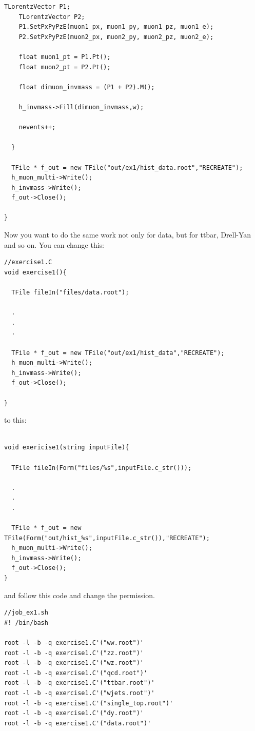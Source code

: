\documentclass[11pt]{article}
\begin{document}
\begin{lstlisting}[emph={if,while,continue,new},emphstyle=\color{nut}]
    TLorentzVector P1;
    TLorentzVector P2;
    P1.SetPxPyPzE(muon1_px, muon1_py, muon1_pz, muon1_e);
    P2.SetPxPyPzE(muon2_px, muon2_py, muon2_pz, muon2_e);

    float muon1_pt = P1.Pt();
    float muon2_pt = P2.Pt();

    float dimuon_invmass = (P1 + P2).M();

    h_invmass->Fill(dimuon_invmass,w);

    nevents++;

  }

  TFile * f_out = new TFile("out/ex1/hist_data.root","RECREATE");
  h_muon_multi->Write();
  h_invmass->Write();
  f_out->Close();

}

\end{lstlisting}
Now you want to do the same work not only for data, but for ttbar, Drell-Yan and so on. You can change this:
\begin{lstlisting}[emph={if,while,continue,new},emphstyle=\color{nut}]
//exercise1.C
void exercise1(){

  TFile fileIn("files/data.root");

  .
  .
  .

  TFile * f_out = new TFile("out/ex1/hist_data","RECREATE"); 
  h_muon_multi->Write();
  h_invmass->Write();
  f_out->Close();

}

\end{lstlisting}
to this:
\begin{lstlisting}[emph={if,while,continue,new},emphstyle=\color{nut}]

void exericise1(string inputFile){

  TFile fileIn(Form("files/%s",inputFile.c_str()));

  .
  .
  .

  TFile * f_out = new TFile(Form("out/hist_%s",inputFile.c_str()),"RECREATE"); 
  h_muon_multi->Write();
  h_invmass->Write();
  f_out->Close();
}

\end{lstlisting}
and follow this code and change the permission.
\begin{lstlisting}[emph={if,while,continue,new},emphstyle=\color{nut}]
//job_ex1.sh
#! /bin/bash

root -l -b -q exercise1.C'("ww.root")'
root -l -b -q exercise1.C'("zz.root")'
root -l -b -q exercise1.C'("wz.root")'
root -l -b -q exercise1.C'("qcd.root")'
root -l -b -q exercise1.C'("ttbar.root")'
root -l -b -q exercise1.C'("wjets.root")'
root -l -b -q exercise1.C'("single_top.root")'
root -l -b -q exercise1.C'("dy.root")'
root -l -b -q exercise1.C'("data.root")'


\end{lstlisting}
\end{document}
